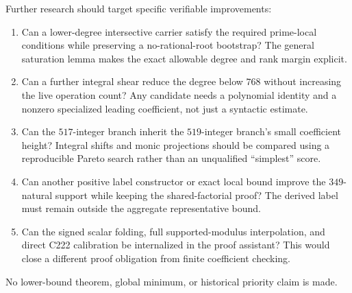 Further research should target specific verifiable improvements:
\begin{enumerate}
\item Can a lower-degree intersective carrier satisfy the required prime-local conditions while preserving a no-rational-root bootstrap? The general saturation lemma makes the exact allowable degree and rank margin explicit.
\item Can a further integral shear reduce the degree below $768$ without increasing the live operation count? Any candidate needs a polynomial identity and a nonzero specialized leading coefficient, not just a syntactic estimate.
\item Can the $517$-integer branch inherit the $519$-integer branch's small coefficient height? Integral shifts and monic projections should be compared using a reproducible Pareto search rather than an unqualified ``simplest'' score.
\item Can another positive label constructor or exact local bound improve the $349$-natural support while keeping the shared-factorial proof? The derived label must remain outside the aggregate representative bound.
\item Can the signed scalar folding, full supported-modulus interpolation, and direct C222 calibration be internalized in the proof assistant? This would close a different proof obligation from finite coefficient checking.
\end{enumerate}
No lower-bound theorem, global minimum, or historical priority claim is made.
